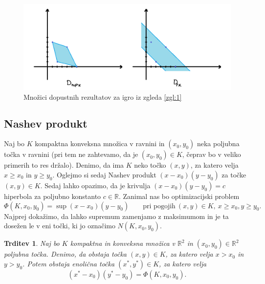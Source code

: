 \documentclass[10pt, a4paper]{article}
\newtheorem{trditev}[izr]{Trditev}
\newcommand{\R}{\mathbb {R}}
\begin{document}
\begin{figure}
  \centering
  \includegraphics[scale=0.7]{images/slika4.png}
  \caption{Množici dopustnih rezultatov za igro iz zgleda \ref{zgl:1}}
\end{figure}

\subsection{Nashev produkt}

Naj bo $K$ kompaktna konveksna množica v ravnini in $(x_0, y_0)$ neka poljubna točka v ravnini 
(pri tem ne zahtevamo, da je $(x_0, y_0) \in K$, čeprav bo v veliko primerih to res držalo).
Denimo, da ima $K$ neko točko $(x, y)$, za katero velja $x \geq x_0$ in $y \geq y_0$.
Oglejmo si sedaj Nashev produkt $(x - x_0) (y - y_0)$ za točke $(x, y) \in K$.
Sedaj lahko opazimo, da je krivulja $(x - x_0) (y - y_0) = c$
hiperbola za poljubno konstanto $c \in \R$. Zanimal nas bo optimizacijski problem 
$$\Phi(K, x_0, y_0) = \sup (x - x_0) (y - y_0)\qquad \text{pri pogojih}\ (x, y) \in K,\ x \geq x_0, y\geq y_0.$$
Najprej dokažimo, da lahko supremum zamenjamo z maksimumom in je ta dosežen le v eni točki,
ki jo označimo $N(K, x_0, y_0)$.

\begin{trditev}
  Naj bo $K$ kompaktna in konveksna množica v $\R^2$ in $(x_0, y_0) \in \R^2$ poljubna točka.
  Denimo, da obstaja točka $(x, y) \in K$, za katero velja $x > x_0$ in $y > y_0$.
  Potem obstaja enolična točka $(x^*, y^*) \in K$, za katero velja
  $$(x^* - x_0) (y^* - y_0) = \Phi(K, x_0, y_0).$$
\end{trditev}
\end{document}
